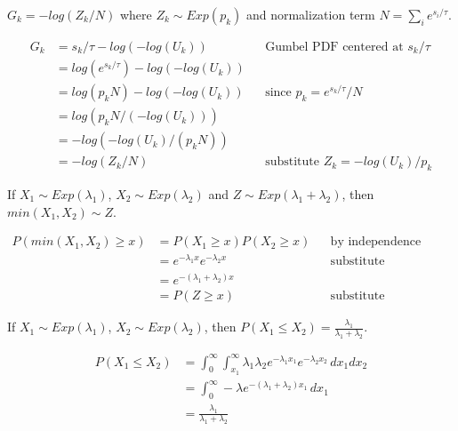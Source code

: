 \documentclass{article}
\begin{document}
 
\begin{lemma} 
\label{g-z-equiv} 
$G_k = -log(Z_k / N)$ where $Z_k \sim Exp(p_k)$ and normalization term $N = \sum_i e^{s_i / \tau}$. 
\end{lemma} 
\begin{align*} 
    G_k &= s_k / \tau - log(-log(U_k)) &&\text{Gumbel PDF centered at } s_k / \tau \\ 
    &= log(e^{s_k / \tau}) - log(-log(U_k)) \\ 
    &= log(p_k N) - log(-log(U_k)) &&\text{since } p_k = e^{s_k / \tau} / N \\ 
    &= log(p_k N / (-log(U_k))) \\ 
    &= -log(-log(U_k) / (p_k N)) \\ 
    &= -log(Z_k / N) &&\text{substitute $Z_k = -log(U_k) / p_k$} 
\end{align*} 
 
\begin{lemma} 
\label{exp-min} 
If $X_1 \sim Exp(\lambda_1)$, $X_2 \sim Exp(\lambda_2)$ and $Z \sim Exp(\lambda_1 + \lambda_2)$, then $min(X_1, X_2) \sim Z$. 
\end{lemma} 
\begin{align*} 
    P(min(X_1, X_2) \geq x) &= P(X_1 \geq x)P(X_2 \geq x) &&\text{by independence} \\ 
    &= e^{-\lambda_1x}e^{-\lambda_2x} &&\text{substitute exponential density} \\ 
    &= e^{-(\lambda_1 + \lambda_2)x} \\ 
    &= P(Z \geq x) &&\text{substitute exponential density} 
\end{align*} 
 
 
\begin{lemma} 
\label{exp-comp} 
If $X_1 \sim Exp(\lambda_1)$, $X_2 \sim Exp(\lambda_2)$, then $P(X_1 \leq X_2) = \frac{\lambda_1}{\lambda_1 + \lambda_2}$. 
 
\begin{align*} 
    P(X_1 \leq X_2) &= \int_0^\infty \int_{x_1}^\infty \lambda_1 \lambda_2 e^{-\lambda_1 x_1} e^{-\lambda_2 x_2} \,dx_1 dx_2 \\ 
    &= \int_0^\infty -\lambda e^{-(\lambda_1 + \lambda_2) x_1} \,dx_1 \\ 
    &= \frac{\lambda_1}{\lambda_1 + \lambda_2} 
\end{align*} 
 
\end{lemma} 
 
\end{document}
